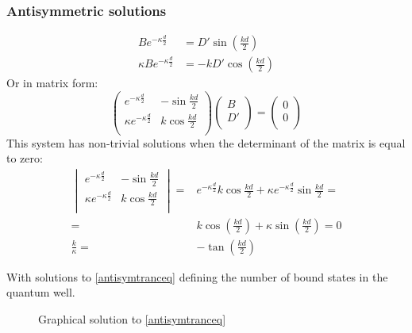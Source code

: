 		\subsubsection{Antisymmetric solutions}
		
		\begin{align}
			Be^{-\kappa \frac{d}{2}} &= D' \sin(\frac{kd}{2}) \\
			\kappa Be^{-\kappa \frac{d}{2}} &= -kD' \cos(\frac{kd}{2})			
		\end{align}
		Or in matrix form:
		\begin{equation}
		\begin{pmatrix}
		e^{-\kappa \frac{d}{2}}			&	-\sin{\frac{kd}{2}}	\\ 
		\kappa e^{-\kappa \frac{d}{2}}	&	k\cos{\frac{kd}{2}}	\\
		\end{pmatrix}
		\begin{pmatrix}
		B \\
		D' \\
		\end{pmatrix}
		=
		\begin{pmatrix}
		0 \\
		0 \\
		\end{pmatrix}			
		\end{equation}
		This system has non-trivial solutions when the determinant of the matrix is equal to zero:
		\begin{align}
			\begin{vmatrix}
				e^{-\kappa \frac{d}{2}}			&	-\sin{\frac{kd}{2}}	\\ 
				\kappa e^{-\kappa \frac{d}{2}}	&	k\cos{\frac{kd}{2}}	\\
			\end{vmatrix}
			=& e^{-\kappa\frac{d}{2}} k\cos{\frac{kd}{2}} + \kappa e^{-\kappa \frac{d}{2}} \sin{\frac{kd}{2}} =\\
			=& k\cos(\frac{kd}{2}) + \kappa\sin(\frac{kd}{2}) = 0 \\
			\frac{k}{\kappa} =& -\tan(\frac{kd}{2}) \label{antisymtranceq}
		\end{align}
		
		With solutions to \ref{antisymtranceq} defining the number of bound states in the quantum well. 
		\begin{figure}[!h]
			\centering
			
			\caption{Graphical solution to \ref{antisymtranceq}}
		\end{figure}
		
